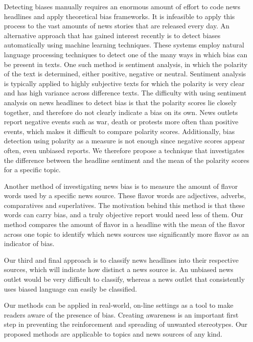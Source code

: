 \documentclass[final]{ieee}
\begin{document}
Detecting biases manually requires an enormous amount of effort to code news headlines and apply theoretical bias frameworks. It is infeasible to apply this process to the vast amounts of news stories that are released every day. An alternative approach that has gained interest recently is to detect biases automatically using machine learning techniques. These systems employ natural language processing techniques to detect one of the many ways in which bias can be present in texts. One such method is sentiment analysis, in which the polarity of the text is determined, either positive, negative or neutral. Sentiment analysis is typically applied to highly subjective texts for which the polarity is very clear and has high variance across difference texts. The difficulty with using sentiment analysis on news headlines to detect bias is that the polarity scores lie closely together, and therefore do not clearly indicate a bias on its own. News outlets report negative events such as war, death or protests more often than positive events, which makes it difficult to compare polarity scores. Additionally, bias detection using polarity as a measure is not enough since negative scores appear often, even unbiased reports. We therefore propose a technique that investigates the difference between the headline sentiment and the mean of the polarity scores for a specific topic. 

Another method of investigating news bias is to measure the amount of flavor words used by a specific news source. These flavor words are adjectives, adverbs, comparatives and superlatives. The motivation behind this method is that these words can carry bias, and a truly objective report would need less of them. Our method compares the amount of flavor in a headline with the mean of the flavor across one topic to identify which news sources use significantly more flavor as an indicator of bias. 

Our third and final approach is to classify news headlines into their respective sources, which will indicate how distinct a news source is. An unbiased news outlet would be very difficult to classify, whereas a news outlet that consistently uses biased language can easily be classified.

Our methods can be applied in real-world, on-line settings as a tool to make readers aware of the presence of bias. Creating awareness is an important first step in preventing the reinforcement and spreading of unwanted stereotypes. Our proposed methods are applicable to topics and news sources of any kind.
\end{document}

